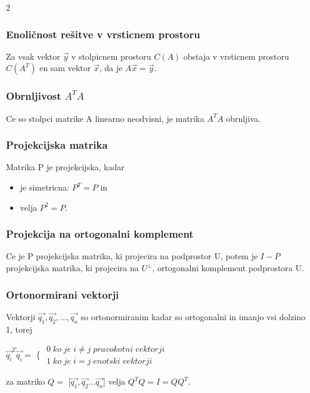 \documentclass{article}
\begin{document}
\begin{multicols}{2}
	\subsubsection{Enoličnost rešitve v vrsticnem prostoru}

	Za vsak vektor $\vec{y}$ v stolpicnem prostoru $C(A)$ obstaja v vrsticnem prostoru $C(A^{T})$ en sam
	vektor $\vec{x}$, da je $A\vec{x} = \vec{y}$.

	\subsubsection{Obrnljivost $A^T A$}

	Ce so stolpci matrike A linearno neodvisni, je matrika $A^{T}A$ obrnljiva.

	\subsubsection{Projekcijska matrika}

	Matrika P je projekcijska, kadar
	\begin{itemize}
		\item je simetricna: $P^{T} = P$ in
		\item velja $P^{2} = P$.
	\end{itemize}

	\subsubsection{Projekcija na ortogonalni komplement}

	Ce je P projekcijska matrika, ki projecira na podprostor U, potem je $I -P$ projekcijska
	matrika, ki projecira na $U^{\perp}$, ortogonalni komplement podprostora U.

	\subsubsection{Ortonormirani vektorji}

	Vektorji $\vec{q_{1}}, \vec{q_{2}}, \dots, \vec{q_{n}}$ so ortonormiranim kadar so ortogonalni in imanjo vsi
	dolzino 1, torej
	\begin{center}
		$\vec{q_{i}}^{T}\vec{q_{i}} = $ \Bigg\{
		$\begin{matrix}
				0\;  ko\; je\; i \neq j\; pravokotni\; vektorji \\
				1\;  ko\; je\; i = j\; enotski\; vektorji
			\end{matrix}$
	\end{center}
	za matriko $Q =$ [$\vec{q_{1}}, \vec{q_{2}} \dots \vec{q_{n}}$]  velja $Q^{T}Q = I = QQ^{T}$.


\end{multicols}
\end{document}

